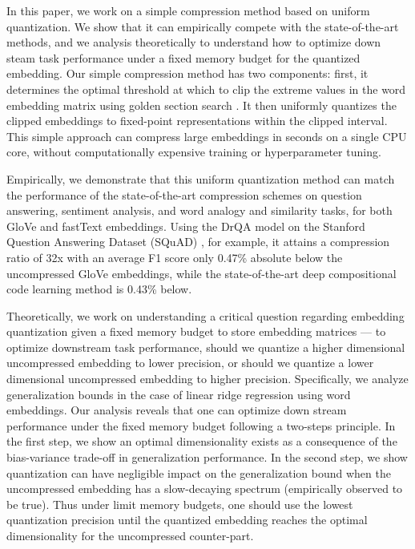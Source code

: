In this paper, we work on a simple compression method based on uniform quantization. We show that it can empirically compete with the state-of-the-art methods, and we analysis theoretically to understand how to optimize down steam task performance under a fixed memory budget for the quantized embedding.
Our simple compression method has two components: first, it determines the optimal threshold at which to clip the extreme values in the word embedding matrix using golden section search \citep{golden53}.
It then uniformly quantizes the clipped embeddings to fixed-point representations within the clipped interval.
This simple approach can compress large embeddings in seconds on a single CPU core, without computationally expensive training or hyperparameter tuning.

Empirically, we demonstrate that this uniform quantization method can match the performance of the state-of-the-art compression schemes on question answering, sentiment analysis, and word analogy and similarity tasks, for both GloVe \citep{glove14} and fastText \citep{fasttext18} embeddings.
Using the DrQA model \citep{drqa17} on the Stanford Question Answering Dataset (SQuAD) \citep{squad16}, for example, it attains a compression ratio of 32x with an average F1 score only 0.47\% absolute below the uncompressed GloVe embeddings, while the state-of-the-art deep compositional code learning method \cite{dccl17} is 0.43\% below.

Theoretically, we work on understanding a critical question regarding embedding quantization given a fixed memory budget to store embedding matrices --- {to optimize downstream task performance, should we quantize a higher dimensional uncompressed embedding to lower precision, or should we quantize a lower dimensional uncompressed embedding to higher precision.} Specifically, we analyze generalization bounds in the case of linear ridge regression using word embeddings.
Our analysis reveals that one can optimize down stream performance under the fixed memory budget following a two-steps principle. In the first step, we show an optimal dimensionality exists as a consequence of the bias-variance trade-off in generalization performance. In the second step, we show quantization can have negligible impact on the generalization bound when the uncompressed embedding has a slow-decaying spectrum (empirically observed to be true). Thus under limit memory budgets, one should use the lowest quantization precision until the quantized embedding reaches the optimal dimensionality for the uncompressed counter-part. 

